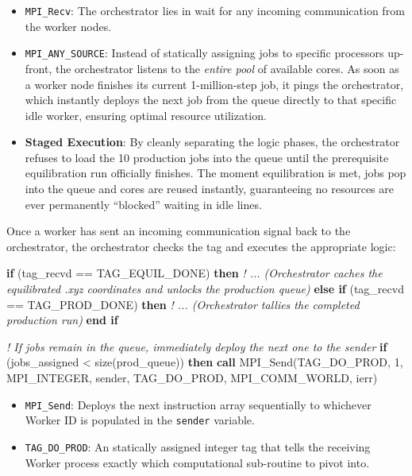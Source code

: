\documentclass[
]{article}
\newenvironment{Shaded}{}{}
\newcommand{\CommentTok}[1]{\textcolor[rgb]{0.38,0.63,0.69}{\textit{#1}}}
\newcommand{\DecValTok}[1]{\textcolor[rgb]{0.25,0.63,0.44}{#1}}
\newcommand{\FunctionTok}[1]{\textcolor[rgb]{0.02,0.16,0.49}{#1}}
\newcommand{\KeywordTok}[1]{\textcolor[rgb]{0.00,0.44,0.13}{\textbf{#1}}}
\newcommand{\NormalTok}[1]{#1}
\newcommand{\OperatorTok}[1]{\textcolor[rgb]{0.40,0.40,0.40}{#1}}
\providecommand{\tightlist}{%
  \setlength{\itemsep}{0pt}\setlength{\parskip}{0pt}}
\begin{document}
\begin{itemize}
\tightlist
\item
  \texttt{MPI\_Recv}: The orchestrator lies in wait for any incoming
  communication from the worker nodes.
\item
  \texttt{MPI\_ANY\_SOURCE}: Instead of statically assigning jobs to
  specific processors up-front, the orchestrator listens to the
  \emph{entire pool} of available cores. As soon as a worker node
  finishes its current 1-million-step job, it pings the orchestrator,
  which instantly deploys the next job from the queue directly to that
  specific idle worker, ensuring optimal resource utilization.
\item
  \textbf{Staged Execution}: By cleanly separating the logic phases, the
  orchestrator refuses to load the 10 production jobs into the queue
  until the prerequisite equilibration run officially finishes. The
  moment equilibration is met, jobs pop into the queue and cores are
  reused instantly, guaranteeing no resources are ever permanently
  ``blocked'' waiting in idle lines.
\end{itemize}

Once a worker has sent an incoming communication signal back to the
orchestrator, the orchestrator checks the tag and executes the
appropriate logic:

\begin{Shaded}
\begin{Highlighting}[]
         \KeywordTok{if}\NormalTok{ (tag\_recvd }\OperatorTok{==}\NormalTok{ TAG\_EQUIL\_DONE) }\KeywordTok{then}
           \CommentTok{! ... (Orchestrator caches the equilibrated .xyz coordinates and unlocks the production queue)}
         \KeywordTok{else if}\NormalTok{ (tag\_recvd }\OperatorTok{==}\NormalTok{ TAG\_PROD\_DONE) }\KeywordTok{then} 
           \CommentTok{! ... (Orchestrator tallies the completed production run)}
         \KeywordTok{end if}

         \CommentTok{! If jobs remain in the queue, immediately deploy the next one to the \textquotesingle{}sender\textquotesingle{}}
         \KeywordTok{if}\NormalTok{ (jobs\_assigned }\OperatorTok{\textless{}} \FunctionTok{size}\NormalTok{(prod\_queue)) }\KeywordTok{then}
            \KeywordTok{call}\NormalTok{ MPI\_Send(TAG\_DO\_PROD, }\DecValTok{1}\NormalTok{, MPI\_INTEGER, sender, TAG\_DO\_PROD, MPI\_COMM\_WORLD, ierr)}
\end{Highlighting}
\end{Shaded}

\begin{itemize}
\tightlist
\item
  \texttt{MPI\_Send}: Deploys the next instruction array sequentially to
  whichever Worker ID is populated in the \texttt{sender} variable.
\item
  \texttt{TAG\_DO\_PROD}: An statically assigned integer tag that tells
  the receiving Worker process exactly which computational sub-routine
  to pivot into.
\end{itemize}
\end{document}
